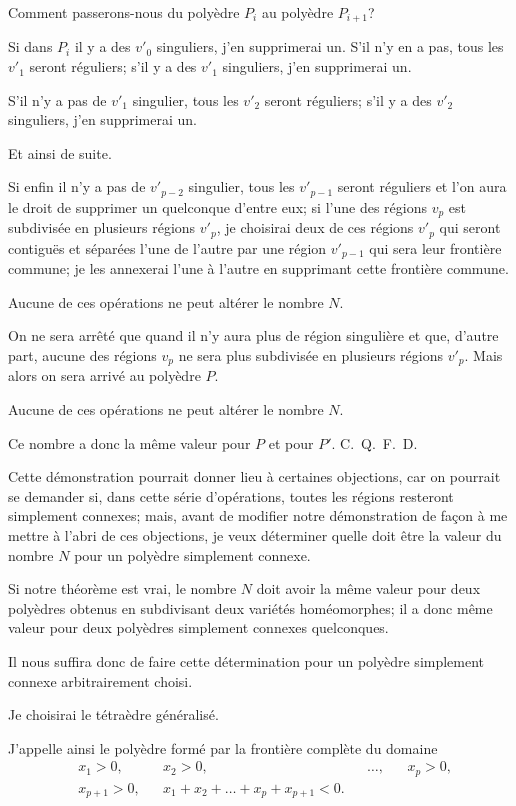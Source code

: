 \documentclass{article}
\begin{document}
Comment passerons-nous du polyèdre $P_{i}$ au polyèdre $P_{i+1}$?

Si dans $P_{i}$ il y a des $v'_{0}$ singuliers, j'en supprimerai un. S'il n'y en a pas, tous les $v'_{1}$ seront réguliers; s'il y a des $v'_{1}$ singuliers, j'en supprimerai un.

S'il n'y a pas de $v'_{1}$ singulier, tous les $v'_{2}$ seront réguliers; s'il y a des $v'_{2}$ singuliers, j'en supprimerai un.

Et ainsi de suite.

Si enfin il n'y a pas de $v'_{p-2}$ singulier, tous les $v'_{p-1}$ seront réguliers et l'on aura le droit de supprimer un quelconque d'entre eux; si l'une des régions $v_{p}$ est subdivisée en plusieurs régions $v'_{p}$, je choisirai deux de ces
régions $v'_{p}$ qui seront contiguës et séparées l'une de l'autre par une région $v'_{p-1}$ qui sera leur frontière commune; je les annexerai l'une à l'autre en supprimant cette frontière commune.

Aucune de ces opérations ne peut altérer le nombre $N$.

On ne sera arrêté que quand il n'y aura plus de région singulière et que, d'autre part, aucune des régions $v_{p}$ ne sera plus subdivisée en plusieurs régions $v'_{p}$. Mais alors on sera arrivé au polyèdre $P$.

Aucune de ces opérations ne peut altérer le nombre $N$.

Ce nombre a donc la même valeur pour $P$ et pour $P'$. C.~Q.~F.~D.

Cette démonstration pourrait donner lieu à certaines objections, car on pourrait se demander si, dans cette série d'opérations, toutes les régions resteront simplement connexes; mais, avant de modifier notre démonstration de façon à me mettre à l'abri de ces objections, je veux déterminer quelle doit être la valeur du nombre $N$ pour un polyèdre simplement connexe.

Si notre théorème est vrai, le nombre $N$ doit avoir la même valeur pour deux polyèdres obtenus en subdivisant deux variétés homéomorphes; il a donc même valeur pour deux polyèdres simplement connexes quelconques.

Il nous suffira donc de faire cette détermination pour un polyèdre simplement connexe arbitrairement choisi.

Je choisirai le tétraèdre généralisé.

J'appelle ainsi le polyèdre formé par la frontière complète du domaine
\[ \begin{aligned} &x_{1} > 0, &&x_{2} > 0, &&\ldots, &&x_{p} > 0,\\ &x_{p+1} > 0, &&x_{1} + x_{2} + \ldots + x_{p} + x_{p+1} < 0. \end{aligned} \]
\end{document}
